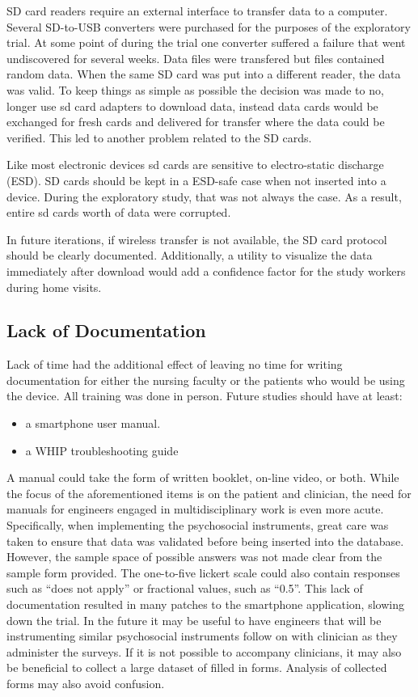 SD card readers require an external interface to transfer data to a computer. Several SD-to-USB converters were purchased for the purposes of the exploratory trial. At some point of during the trial one converter suffered a failure that went undiscovered for several weeks. Data files were transfered but files contained random data. When the same SD card was put into a different reader, the data was valid. To keep things as simple as possible the decision was made to no, longer use sd card adapters to download data, instead data cards would be exchanged for fresh cards and delivered for transfer where the data could be verified. This led to another problem related to the SD cards.

Like most electronic devices sd cards are sensitive to electro-static discharge (ESD). SD cards should be kept in a ESD-safe case when not inserted into a device. During the exploratory study, that was not always the case. 
As a result, entire sd cards worth of data were corrupted.

In future iterations, if wireless transfer is not available, the SD card protocol should be clearly documented. Additionally, a utility to visualize the data immediately after download would add a confidence factor for the study workers during home visits.

\subsection{Lack of Documentation}
Lack of time had the additional effect of leaving no time for writing documentation for either the nursing faculty or the patients who would be using the device. All training was done in person. Future studies should have at least:
\begin{itemize}
\item a smartphone user manual.
\item a WHIP troubleshooting guide
\end{itemize}

A manual could take the form of written booklet, on-line video, or both. 
While the focus of the aforementioned items is on the patient and clinician, the need for manuals for engineers engaged in multidisciplinary work is even more acute. Specifically, when implementing the psychosocial instruments, great care was taken to ensure that data was validated before being inserted into the database. However, the sample space of possible answers was not made clear from the sample form provided. The one-to-five lickert scale could also contain responses such as ``does not apply'' or fractional values, such as ``0.5''. This lack of documentation resulted in many patches to the smartphone application, slowing down the trial. In the future it may be useful to have engineers that will be instrumenting similar psychosocial instruments follow on with clinician as they administer the surveys. If it is not possible to accompany clinicians, it may also be beneficial to collect a large dataset of filled in forms. Analysis of collected forms may also avoid confusion.
